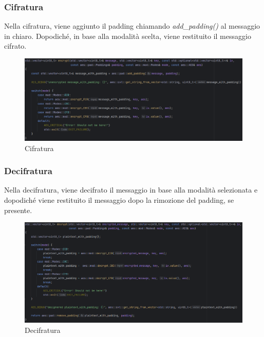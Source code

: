 \subsubsection{Cifratura}

\textsf{\small Nella cifratura, viene aggiunto il padding chiamando \emph{add\_padding()} al messaggio in chiaro. Dopodiché, in base alla modalità scelta, viene restituito il messaggio cifrato.}

\begin{figure}[H]
	\centering
	\includegraphics[width=1\textwidth, height=1\textheight, keepaspectratio]{./images/code/cpp/api/encrypt.PNG}
	\caption{Cifratura}
	\label{fig:encrypt}
\end{figure}


\subsubsection{Decifratura}

\textsf{\small Nella decifratura, viene decifrato il messaggio in base alla modalità selezionata e dopodiché viene restituito il messaggio dopo la rimozione del padding, se presente.}

\begin{figure}[H]
	\centering
	\includegraphics[width=1\textwidth, height=1\textheight, keepaspectratio]{./images/code/cpp/api/decrypt.PNG}
	\caption{Decifratura}
	\label{fig:decrypt}
\end{figure}

